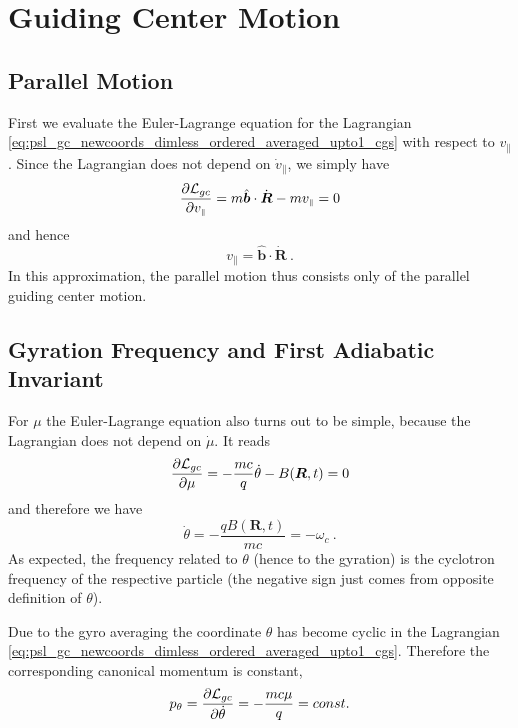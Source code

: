 \documentclass{scrartcl}
\renewcommand{\vec}[1]{\boldsymbol{#1}}
\newcommand{\uv}[1]{\hat{\vec{#1}}}
\newcommand{\rvgc}{\vec{R}} %
\newcommand{\PSL}{\mathcal{L}}
\newcommand{\subparallel}{{\scriptscriptstyle\parallel}}
\begin{document}
\section{Guiding Center Motion}

\subsection{Parallel Motion}
First we evaluate the Euler-Lagrange equation for the Lagrangian \eqref{eq:psl_gc_newcoords_dimless_ordered_averaged_upto1_cgs} with respect to $v_\subparallel$. Since the Lagrangian does not depend on $\dot{v}_\subparallel$, we simply have
\begin{equation*}
    \pdv{\PSL_{gc}}{v_\subparallel} = m\uv{b}\cdot\dot{\rvgc} - mv_\subparallel = 0
\end{equation*}
and hence
\begin{equation}\label{eq:v_para_result}
    v_\subparallel = \uv{b}\cdot\dot{\rvgc} \ .
\end{equation}
In this approximation, the parallel motion thus consists only of the parallel guiding center motion.

\subsection{Gyration Frequency and First Adiabatic Invariant}
For $\mu$ the Euler-Lagrange equation also turns out to be simple, because the Lagrangian does not depend on $\dot{\mu}$. It reads
\begin{equation*}
    \pdv{\PSL_{gc}}{\mu} = -\frac{mc}{q}\dot{\theta} - B(\rvgc,t) = 0
\end{equation*}
and therefore we have
\begin{equation}\label{eq:theta_dot_omegac}
    \dot{\theta} = -\frac{qB(\rvgc,t)}{mc} = -\omega_c \ .
\end{equation}
As expected, the frequency related to $\theta$ (hence to the gyration) is the cyclotron frequency of the respective particle (the negative sign just comes from opposite definition of $\theta$).

Due to the gyro averaging the coordinate $\theta$ has become cyclic in the Lagrangian \eqref{eq:psl_gc_newcoords_dimless_ordered_averaged_upto1_cgs}. Therefore the corresponding canonical momentum is constant,
\begin{equation}\label{eq:mu_const}
p_\theta = \pdv{\PSL_{gc}}{\dot{\theta}} = -\frac{mc\mu}{q} = const.    
\end{equation}
\end{document}
